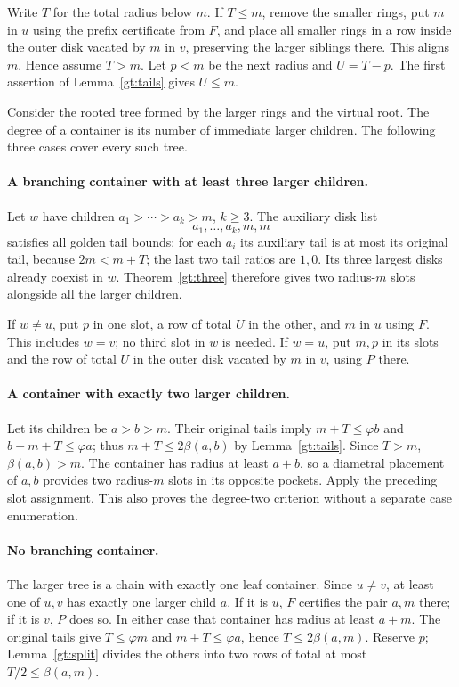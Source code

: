 Write $T$ for the total radius below $m$. If $T\le m$, remove the
smaller rings, put $m$ in $u$ using the prefix certificate from $F$,
and place all smaller rings in a row inside the outer disk vacated
by $m$ in $v$, preserving the larger siblings there. This aligns $m$.
Hence assume $T>m$. Let $p<m$ be the next radius and $U=T-p$.
The first assertion of Lemma~\ref{gt:tails} gives $U\le m$.

Consider the rooted tree formed by the larger rings and the virtual
root. The degree of a container is its number of immediate larger
children. The following three cases cover every such tree.

\paragraph{A branching container with at least three larger children.}
Let $w$ have children $a_1>\cdots>a_k>m$, $k\ge3$. The auxiliary
disk list
\[
 a_1,\ldots,a_k,m,m
\]
satisfies all golden tail bounds: for each $a_i$ its auxiliary tail
is at most its original tail, because $2m<m+T$; the last two tail
ratios are $1,0$. Its three largest disks already coexist in $w$.
Theorem~\ref{gt:three} therefore gives two radius-$m$ slots alongside
all the larger children.

If $w\ne u$, put $p$ in one slot, a row of total $U$ in the other,
and $m$ in $u$ using $F$. This includes $w=v$; no third slot in $w$
is needed. If $w=u$, put $m,p$ in its slots and the row of total $U$
in the outer disk vacated by $m$ in $v$, using $P$ there.

\paragraph{A container with exactly two larger children.}
Let its children be $a>b>m$. Their original tails imply
$m+T\le\varphi b$ and $b+m+T\le\varphi a$; thus
$m+T\le2\beta(a,b)$ by Lemma~\ref{gt:tails}. Since $T>m$,
$\beta(a,b)>m$. The container has radius at least $a+b$, so a diametral
placement of $a,b$ provides two radius-$m$ slots in its opposite pockets.
Apply the preceding slot assignment. This also proves the degree-two
criterion without a separate case enumeration.

\paragraph{No branching container.}
The larger tree is a chain with exactly one leaf container. Since
$u\ne v$, at least one of $u,v$ has exactly one larger child $a$.
If it is $u$, $F$ certifies the pair $a,m$ there; if it is $v$, $P$
does so. In either case that container has radius at least $a+m$.
The original tails give $T\le\varphi m$ and $m+T\le\varphi a$, hence
$T\le2\beta(a,m)$. Reserve $p$; Lemma~\ref{gt:split} divides
the others into two rows of total at most $T/2\le\beta(a,m)$.

